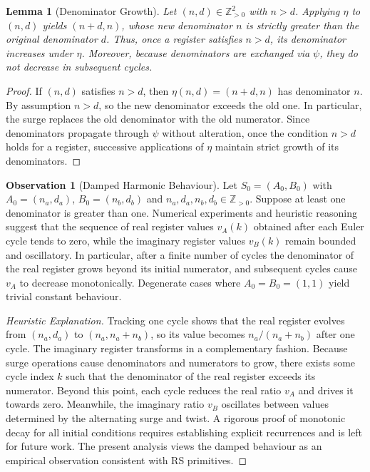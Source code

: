\documentclass[11pt, letterpaper]{article}
\newcommand{\Z}{\mathbb{Z}}
\newcommand{\aop}{\eta}
\newcommand{\psiop}{\psi}
\theoremstyle{definition}
\newtheorem{observation}{Observation}[section]
\theoremstyle{plain}
\newtheorem{lemma}{Lemma}[section]
\begin{document}
\begin{lemma}[Denominator Growth]
Let $(n,d)\in \Z_{>0}^2$ with $n > d$.  Applying $\aop$ to $(n,d)$ yields
$(n+d,n)$, whose new denominator $n$ is strictly greater than the original
denominator $d$.  Thus, once a register satisfies $n>d$, its denominator
increases under $\aop$.  Moreover, because denominators are exchanged via
$\psiop$, they do not decrease in subsequent cycles.
\end{lemma}

\begin{proof}
If $(n,d)$ satisfies $n > d$, then $\aop(n,d)=(n+d,n)$ has denominator $n$.
By assumption $n > d$, so the new denominator exceeds the old one.  In
particular, the surge replaces the old denominator with the old numerator.
Since denominators propagate through $\psiop$ without alteration, once the
condition $n > d$ holds for a register, successive applications of $\aop$
maintain strict growth of its denominators.
\end{proof}

\begin{observation}[Damped Harmonic Behaviour]
Let $S_0=(A_0,B_0)$ with $A_0=(n_a,d_a)$, $B_0=(n_b,d_b)$ and
$n_a,d_a,n_b,d_b\in \Z_{>0}$.  Suppose at least one denominator is greater
than one.  Numerical experiments and heuristic reasoning suggest that the
sequence of real register values $v_A(k)$ obtained after each Euler cycle
tends to zero, while the imaginary register values $v_B(k)$ remain bounded
and oscillatory.  In particular, after a finite number of cycles the
denominator of the real register grows beyond its initial numerator, and
subsequent cycles cause $v_A$ to decrease monotonically.  Degenerate cases
where $A_0=B_0=(1,1)$ yield trivial constant behaviour.

\begin{proof}[Heuristic Explanation]
Tracking one cycle shows that the real register evolves from $(n_a,d_a)$ to
$(n_a,n_a+n_b)$, so its value becomes $n_a/(n_a+n_b)$ after one cycle.  The
imaginary register transforms in a complementary fashion.  Because
surge operations cause denominators and numerators to grow, there exists
some cycle index $k$ such that the denominator of the real register
exceeds its numerator.  Beyond this point, each cycle reduces the real
ratio $v_A$ and drives it towards zero.  Meanwhile, the imaginary
ratio $v_B$ oscillates between values determined by the alternating surge
and twist.  A rigorous proof of monotonic decay for all initial
conditions requires establishing explicit recurrences and is left for
future work.  The present analysis views the damped behaviour as an
empirical observation consistent with RS primitives.
\end{proof}
\end{observation}
\end{document}

